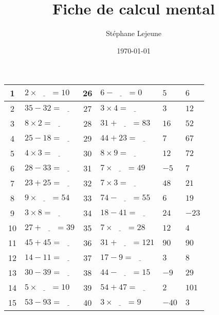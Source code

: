 \documentclass[french,a4paper,10pt]{article}
\title{\hspace{-2.0cm}\color{astral} \sffamily \bfseries Fiche de calcul mental}
\author{\hspace{-2.0cm}Stéphane Lejeune}
\date{\hspace{-2.0cm}\today}
\begin{document}
\maketitle
\noindent
\renewcommand{\arraystretch}{1.6}
\center
\begin{tabular}{|c|p{4cm}|c|p{4cm}||p{1cm}|p{1cm}|}
\hline
1 & $2 \times \underline{\phantom{999}} = 10$ & 26 & $6 - \underline{\phantom{999}} = 0$ & $5$ & $6$ \\
\hline
2 & $35 - 32 = \underline{\phantom{999}}$ & 27 & $3 \times 4 = \underline{\phantom{999}}$ & $3$ & $12$ \\
\hline
3 & $8 \times 2 = \underline{\phantom{999}}$ & 28 & $31 + \underline{\phantom{999}} = 83$ & $16$ & $52$ \\
\hline
4 & $25 - 18 = \underline{\phantom{999}}$ & 29 & $44 + 23 = \underline{\phantom{999}}$ & $7$ & $67$ \\
\hline
5 & $4 \times 3 = \underline{\phantom{999}}$ & 30 & $8 \times 9 = \underline{\phantom{999}}$ & $12$ & $72$ \\
\hline
6 & $28 - 33 = \underline{\phantom{999}}$ & 31 & $7 \times \underline{\phantom{999}} = 49$ & $-5$ & $7$ \\
\hline
7 & $23 + 25 = \underline{\phantom{999}}$ & 32 & $7 \times 3 = \underline{\phantom{999}}$ & $48$ & $21$ \\
\hline
8 & $9 \times \underline{\phantom{999}} = 54$ & 33 & $74 - \underline{\phantom{999}} = 55$ & $6$ & $19$ \\
\hline
9 & $3 \times 8 = \underline{\phantom{999}}$ & 34 & $18 - 41 = \underline{\phantom{999}}$ & $24$ & $-23$ \\
\hline
10 & $27 + \underline{\phantom{999}} = 39$ & 35 & $7 \times \underline{\phantom{999}} = 28$ & $12$ & $4$ \\
\hline
11 & $45 + 45 = \underline{\phantom{999}}$ & 36 & $31 + \underline{\phantom{999}} = 121$ & $90$ & $90$ \\
\hline
12 & $14 - 11 = \underline{\phantom{999}}$ & 37 & $17 - 9 = \underline{\phantom{999}}$ & $3$ & $8$ \\
\hline
13 & $30 - 39 = \underline{\phantom{999}}$ & 38 & $44 - \underline{\phantom{999}} = 15$ & $-9$ & $29$ \\
\hline
14 & $5 \times \underline{\phantom{999}} = 10$ & 39 & $54 + 47 = \underline{\phantom{999}}$ & $2$ & $101$ \\
\hline
15 & $53 - 93 = \underline{\phantom{999}}$ & 40 & $3 \times \underline{\phantom{999}} = 9$ & $-40$ & $3$ \\

\end{tabular}
\end{document}
